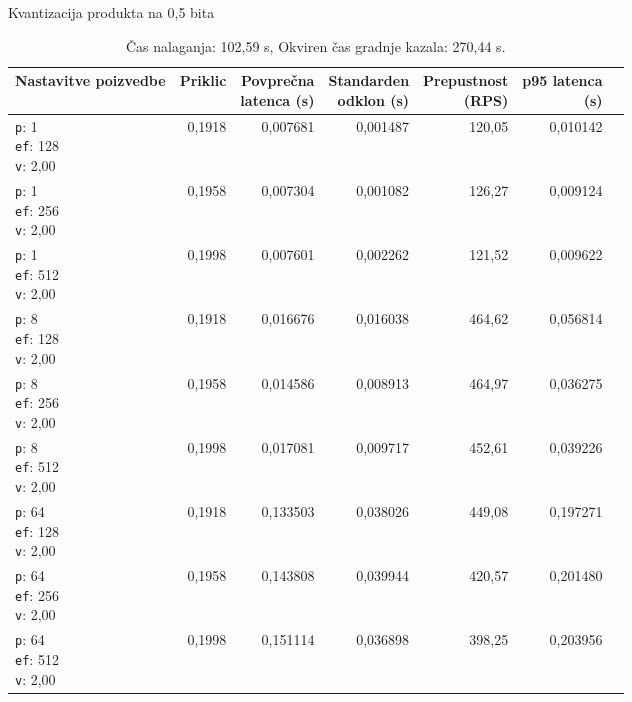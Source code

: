 \begin{table}[htbp]
  \centering
\small
  \caption{Kvantizacija produkta na 0,5 bita}
  \label{tab:single-2cpu-4ram:pqx64:qdrant-dipl-baseline-tenant-subgraph-pqx64-m16-ef-128-random-768-100-tenants-extended-upload-2026-08-18-00-07-30.json}
  \begin{tabularx}{\textwidth}{Xrrrrrr}
    \toprule
    Nastavitve poizvedbe & Priklic & \makecell{Povprečna\\latenca (s)} & \makecell{Standarden\\odklon (s)} & \makecell{Prepustnost\\(RPS)} & \makecell{p95 latenca\\(s)}  \\
    \midrule
    \makecell{\texttt{p}: 1\\\texttt{ef}: 128\\\texttt{v}: 2,00} & 0,1918 & 0,007681 & 0,001487 & 120,05 & 0,010142 \\
    \makecell{\texttt{p}: 1\\\texttt{ef}: 256\\\texttt{v}: 2,00} & 0,1958 & 0,007304 & 0,001082 & 126,27 & 0,009124 \\
    \makecell{\texttt{p}: 1\\\texttt{ef}: 512\\\texttt{v}: 2,00} & 0,1998 & 0,007601 & 0,002262 & 121,52 & 0,009622 \\
    \makecell{\texttt{p}: 8\\\texttt{ef}: 128\\\texttt{v}: 2,00} & 0,1918 & 0,016676 & 0,016038 & 464,62 & 0,056814 \\
    \makecell{\texttt{p}: 8\\\texttt{ef}: 256\\\texttt{v}: 2,00} & 0,1958 & 0,014586 & 0,008913 & 464,97 & 0,036275 \\
    \makecell{\texttt{p}: 8\\\texttt{ef}: 512\\\texttt{v}: 2,00} & 0,1998 & 0,017081 & 0,009717 & 452,61 & 0,039226 \\
    \makecell{\texttt{p}: 64\\\texttt{ef}: 128\\\texttt{v}: 2,00} & 0,1918 & 0,133503 & 0,038026 & 449,08 & 0,197271 \\
    \makecell{\texttt{p}: 64\\\texttt{ef}: 256\\\texttt{v}: 2,00} & 0,1958 & 0,143808 & 0,039944 & 420,57 & 0,201480 \\
    \makecell{\texttt{p}: 64\\\texttt{ef}: 512\\\texttt{v}: 2,00} & 0,1998 & 0,151114 & 0,036898 & 398,25 & 0,203956 \\
    \bottomrule
  \end{tabularx}
\caption* {Čas nalaganja: 102,59 s, Okviren čas gradnje kazala: 270,44 s.}\end{table}

